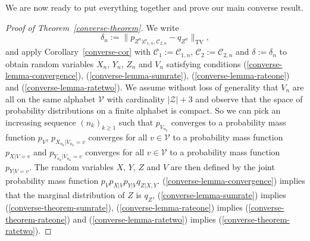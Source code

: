 \documentclass[journal]{IEEEtran}
\newcommand{\lemmaconst}{\delta}
\newcommand{\channelpmf}{q}
\newcommand{\codebookpmf}{p}
\newcommand{\generalLimitIndex}{k}
\newcommand{\channelInOne}{X}
\newcommand{\channelInTwo}{Y}
\newcommand{\channelOut}{Z}
\newcommand{\channelOutAlph}{\mathcal{Z}}
\newcommand{\codebook}{\mathcal{C}}
\newcommand{\codebookOne}{\mathcal{C}_1}
\newcommand{\codebookTwo}{\mathcal{C}_2}
\newcommand{\codebookBlocklength}{n}
\newcommand{\totalvariation}[1]{\lVert #1 \rVert_\mathrm{TV}}
\newcommand{\cardinality}[1]{\lvert #1 \rvert}
\newcommand{\timeSharingRV}{V}
\newcommand{\timeSharingAlph}{\mathcal{V}}
\newcommand{\timeSharingAlphElement}{v}
\begin{document}
We are now ready to put everything together and prove our main converse result.
\begin{proof}[Proof of Theorem~\ref{converse-theorem}]
We write
\[
\lemmaconst_\codebookBlocklength
:=
\totalvariation{\codebookpmf_{\channelOut^\codebookBlocklength | \codebook_{1,\codebookBlocklength}, \codebook_{2,\codebookBlocklength}} - \channelpmf_{\channelOut^\codebookBlocklength}},
\]
and apply Corollary~\ref{converse-cor} with $\codebookOne := \codebook_{1,\codebookBlocklength}$, $\codebookTwo := \codebook_{2,\codebookBlocklength}$ and $\lemmaconst := \lemmaconst_\codebookBlocklength$ to obtain random variables $\channelInOne_\codebookBlocklength$, $\channelInTwo_\codebookBlocklength$, $\channelOut_\codebookBlocklength$ and $\timeSharingRV_\codebookBlocklength$ satisfying conditions (\ref{converse-lemma-convergence}), (\ref{converse-lemma-sumrate}), (\ref{converse-lemma-rateone}) and (\ref{converse-lemma-ratetwo}). We assume without loss of generality that $\timeSharingRV_\codebookBlocklength$ are all on the same alphabet $\timeSharingAlph$ with cardinality $\cardinality{\channelOutAlph} + 3$ and observe that the space of probability distributions on a finite alphabet is compact. So we can pick an increasing sequence $(\codebookBlocklength_\generalLimitIndex)_{\generalLimitIndex \geq 1}$ such that $\codebookpmf_{\timeSharingRV_{\codebookBlocklength_\generalLimitIndex}}$ converges to a probability mass function $\codebookpmf_{\timeSharingRV}$, $\codebookpmf_{\channelInOne_{\codebookBlocklength_\generalLimitIndex} |\timeSharingRV_{\codebookBlocklength_\generalLimitIndex}=\timeSharingAlphElement}$ converges for all $\timeSharingAlphElement \in \timeSharingAlph$ to a probability mass function $\codebookpmf_{\channelInOne|\timeSharingRV=\timeSharingAlphElement}$ and $\codebookpmf_{\channelInTwo_{\codebookBlocklength_\generalLimitIndex}|\timeSharingRV_{\codebookBlocklength_\generalLimitIndex}=\timeSharingAlphElement}$ converges for all $\timeSharingAlphElement \in \timeSharingAlph$ to a probability mass function $\codebookpmf_{\channelInTwo|\timeSharingRV=\timeSharingAlphElement}$. The random variables $\channelInOne$, $\channelInTwo$, $\channelOut$ and $\timeSharingRV$ are then defined by the joint probability mass function $\codebookpmf_\timeSharingRV \codebookpmf_{\channelInOne | \timeSharingRV} \codebookpmf_{\channelInTwo | \timeSharingRV} \channelpmf_{\channelOut | \channelInOne, \channelInTwo}$. (\ref{converse-lemma-convergence}) implies that the marginal distribution of $\channelOut$ is $\channelpmf_\channelOut$, (\ref{converse-lemma-sumrate}) implies (\ref{converse-theorem-sumrate}), (\ref{converse-lemma-rateone}) implies (\ref{converse-theorem-rateone}) and (\ref{converse-lemma-ratetwo}) implies (\ref{converse-theorem-ratetwo}).
\end{proof}
\end{document}
